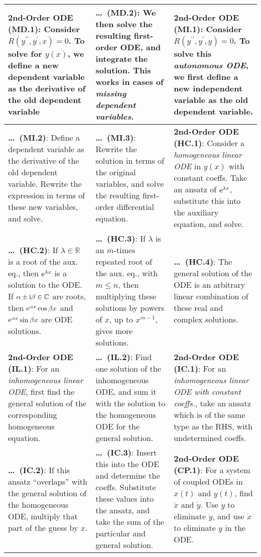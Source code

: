 \begin{tabular}{|m{.31\linewidth}|m{.31\linewidth}|m{.31\linewidth}|}
%
\hline
\textbf{2nd-Order ODE (MD.1)}: Consider $R(y^{\prime\prime},y^\prime,x)=0$. To
solve for $y(x)$, we define a new dependent variable as the derivative of the
old dependent variable &
%
\textbf{\ldots\ (MD.2)}: We then solve the resulting first-order ODE, and
integrate the solution. This works in cases of \emph{missing dependent
variables}. &
%
\textbf{2nd-Order ODE (MI.1)}: Consider $R(y^{\prime\prime},y^\prime,y)=0$. To
solve this \emph{autonomous ODE}, we first define a new independent variable as
the old dependent variable. \\
%
\hline
%
\textbf{\ldots\ (MI.2)}: Define a dependent variable as the derivative of the
old dependent variable. Rewrite the expression in terms of these new variables,
and solve. &
%
\textbf{\ldots\ (MI.3)}: Rewrite the solution in terms of the original
variables, and solve the resulting first-order differential equation. &
%
\textbf{2nd-Order ODE (HC.1)}: Consider a \emph{homogeneous linear ODE} in
$y(x)$ with constant coeffs. Take an ansatz of $\mathrm{e}^{\lambda x}$,
substitute this into the auxiliary equation, and solve. \\
%
\hline
%
\textbf{\ldots\ (HC.2)}: If $\lambda\in\mathbb{R}$ is a root of the aux.  eq.,
then $\mathrm{e}^{\lambda x}$ is a solution to the ODE.  If
$\alpha\pm\mathrm{i}\beta\in\mathbb{C}$ are roots, then
$\mathrm{e}^{\alpha x}\cos\beta x$ and $\mathrm{e}^{\alpha x}\sin\beta x$
are ODE solutions. &
%
\textbf{\ldots\ (HC.3)}: If $\lambda$ is an $m$-times repeated root of the aux.
eq., with $m\leq n$, then multiplying these solutions by powers of $x$, up to
$x^{m-1}$, gives more solutions. &
%
\textbf{\ldots\ (HC.4)}: The general solution of the ODE is an arbitrary linear
combination of these real and complex solutions. \\
%
\hline
%
\textbf{2nd-Order ODE (IL.1)}: For an \emph{inhomogeneous linear ODE}, first
find the general solution of the corresponding homogeneous equation. &
%
\textbf{\ldots\ (IL.2)}: Find one solution of the inhomogeneous ODE, and
sum it with the solution to the homogeneous ODE for the general solution. &
%
\textbf{2nd-Order ODE (IC.1)}: For an \emph{inhomogeneous linear ODE with
constant coeffs.}, take an ansatz which is of the same type as the RHS, with
undetermined coeffs. \\
%
\hline
%
\textbf{\ldots\ (IC.2)}: If this ansatz ``overlaps'' with the general
solution of the homogeneous ODE, multiply that part of the guess by $x$. &
%
\textbf{\ldots\ (IC.3)}: Insert this into the ODE and determine the coeffs.
Substitute these values into the ansatz, and take the sum of the particular and
general solution. &
%
\textbf{2nd-Order ODE (CP.1)}: For a system of coupled ODEs in $x(t)$ and
$y(t)$, find $\ddot{x}$ and $\dot{y}$. Use $\dot{y}$ to eliminate $\dot{y}$, and
use $\dot{x}$ to eliminate $y$ in the ODE. \\
%
\hline
\end{tabular}
